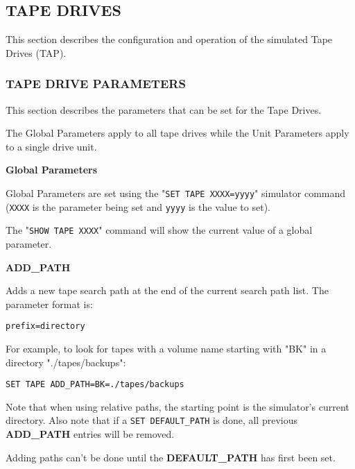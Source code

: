 
\subsection[Tape Drives]{TAPE DRIVES}

This section describes the configuration and operation of the simulated Tape Drives (TAP).

\subsubsection[Operator Console Options]{TAPE DRIVE PARAMETERS}

This section describes the parameters that can be set for the Tape Drives.

The Global Parameters apply to all tape drives while the Unit Parameters apply to a single drive unit.

\textbf{Global Parameters}

Global Parameters are set using the "\texttt{SET TAPE XXXX=yyyy}" simulator command (\texttt{XXXX} is the parameter being
set and \texttt{yyyy} is the value to set).

The "\texttt{SHOW TAPE XXXX}" command will show the current value of a global parameter.

\textbf{ADD\_PATH}

\begin{adjustwidth}{5ex}{1ex}
	Adds a new tape search path at the end of the current search path list. The parameter format is:
\begin{adjustwidth}{5ex}{1ex}
	\texttt{prefix=directory}
\end{adjustwidth}
	For example, to look for tapes with a volume name starting with "BK" in a directory "./tapes/backups":
\begin{adjustwidth}{5ex}{1ex}
	\texttt{SET TAPE ADD\_PATH=BK=./tapes/backups}
\end{adjustwidth}
	Note that when using relative paths, the starting point is the simulator's current directory.
	Also note that if a \texttt{SET DEFAULT\_PATH} is done, all previous \textbf{ADD\_PATH} entries
	will be removed.
	
	Adding paths can't be done until the \textbf{DEFAULT\_PATH} has first been set.
\end{adjustwidth}

